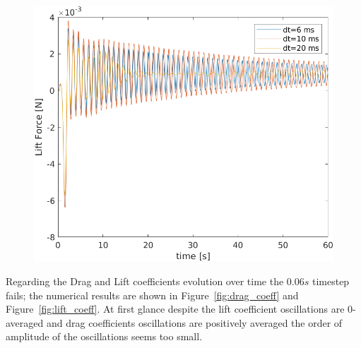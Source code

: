 \documentclass[12pt]{article}
\begin{document}
        \begin{figure}[!ht]
                \includegraphics[width=\textwidth]{LiftForce.png}
                \centering
                \caption{}
                \label{fig:lift}
        \end{figure}

        Regarding the Drag and Lift coefficients evolution over time the $0.06 s$ timestep fails; the numerical results are shown in Figure~\ref{fig:drag_coeff} and  Figure~\ref{fig:lift_coeff}. At first glance despite the lift coefficient oscillations are 0-averaged and drag coefficients oscillations are positively averaged the order of amplitude of the oscillations seems too small. 
\end{document}
